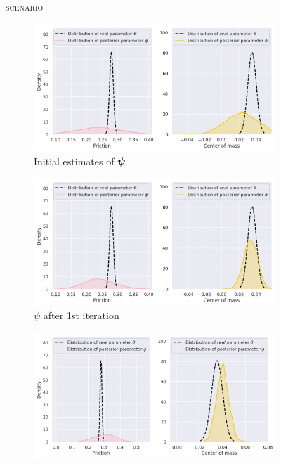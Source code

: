 \begin{figure}
\centering
\textsc{\MakeLowercase{\yp{} scenario}}\\
\medskip
\begin{subfigure}{0.45\textwidth}
  \includegraphics[width=\textwidth]{img/yumi/latent-representation/yumi_latent_encoding_0_iter}
  \caption{Initial estimates of $\boldsymbol{\psi}$}
\end{subfigure}
\begin{subfigure}{0.45\textwidth}
  \centering
  \includegraphics[width=\linewidth]{img/yumi/latent-representation/yumi_latent_encoding_1_iter}
  \caption{$\psi$ after 1st iteration}
\end{subfigure}
\begin{subfigure}{0.45\textwidth}
  \centering
  \includegraphics[width=\linewidth]{img/yumi/latent-representation/yumi_latent_encoding_2_iter}

\end{subfigure}
\end{figure}
